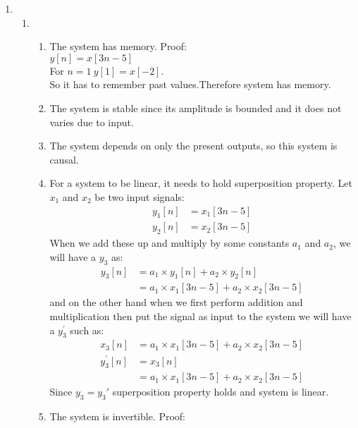 \documentclass[10pt,a4paper, margin=1in]{article}
\begin{document}
\begin{enumerate}
\begin{enumerate}
    \end{enumerate}    

\item %
    \begin{enumerate}
    \item %
    \begin{enumerate}
        \item The system has memory. Proof:\\
        \(y[n]=x[3n-5]\)\\
        For \(n=1\ y[1]=x[-2]\).\\
    So it has to remember past values.Therefore system has memory.
        \item The system is stable since its amplitude is bounded and it does not varies due to input.
        \item The system depends on only the present outputs, so this system is causal.
        \item For a system to be linear, it needs to hold superposition property. Let $x_1$ and $x_2$ be two input signals:
            \begin{align*}
            y_1[n] & = x_1[3n-5] \\
            y_2[n] & = x_2[3n-5]
            \end{align*}
            When we add these up and multiply by some constants $a_1$ and $a_2$, we will have a $y_3$ as:
            \begin{align*}
            y_3[n]&= a_1 \times y_1[n] + a_2 \times y_2[n] \\
                  &= a_1 \times x_1[3n-5]+ a_2 \times x_2[3n-5]
            \end{align*}
            and on the other hand when we first perform addition and multiplication then put the signal as input to the system we will have a $y_3^{'}$ such as:
            \begin{align*}
                x_3[n]&=a_1\times x_1[3n-5] + a_2\times x_2[3n-5] \\
                y_3^{'}[n]&= x_3[n]\\
                &=a_1\times x_1[3n-5] + a_2\times x_2[3n-5]
            \end{align*}
            Since $y_3 = y_3'$ superposition property holds and system is linear.
        \item The system is invertible. Proof:

\end{enumerate}
\end{enumerate}
\end{enumerate}
\end{document}
